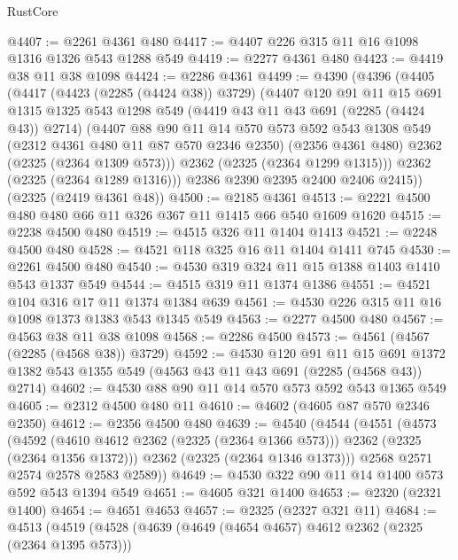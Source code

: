\begin{lexlean}{RustCore}
\begin{coremodule}
@4407 := @2261 @4361 @480
@4417 := @4407 @226 @315 @11 @16 @1098 @1316 @1326 @543 @1288 @549
@4419 := @2277 @4361 @480
@4423 := @4419 @38 @11 @38 @1098
@4424 := @2286 @4361
@4499 := @4390
    (@4396
      (@4405
        (@4417
          (@4423 (@2285 (@4424 @38)) @3729)
          (@4407
            @120
            @91
            @11
            @15
            @691
            @1315
            @1325
            @543
            @1298
            @549
            (@4419 @43 @11 @43 @691 (@2285 (@4424 @43)) @2714)
            (@4407
              @88
              @90
              @11
              @14
              @570
              @573
              @592
              @543
              @1308
              @549
              (@2312 @4361 @480 @11 @87 @570 @2346 @2350)
              (@2356 @4361 @480)
              @2362
              (@2325 (@2364 @1309 @573)))
            @2362
            (@2325 (@2364 @1299 @1315)))
          @2362
          (@2325 (@2364 @1289 @1316)))
        @2386
        @2390
        @2395
        @2400
        @2406
        @2415))
    (@2325 (@2419 @4361 @48))
@4500 := @2185 @4361
@4513 := @2221 @4500 @480 @480 @66 @11 @326 @367 @11 @1415 @66 @540 @1609 @1620
@4515 := @2238 @4500 @480
@4519 := @4515 @326 @11 @1404 @1413
@4521 := @2248 @4500 @480
@4528 := @4521 @118 @325 @16 @11 @1404 @1411 @745
@4530 := @2261 @4500 @480
@4540 := @4530 @319 @324 @11 @15 @1388 @1403 @1410 @543 @1337 @549
@4544 := @4515 @319 @11 @1374 @1386
@4551 := @4521 @104 @316 @17 @11 @1374 @1384 @639
@4561 := @4530 @226 @315 @11 @16 @1098 @1373 @1383 @543 @1345 @549
@4563 := @2277 @4500 @480
@4567 := @4563 @38 @11 @38 @1098
@4568 := @2286 @4500
@4573 := @4561 (@4567 (@2285 (@4568 @38)) @3729)
@4592 := @4530
    @120
    @91
    @11
    @15
    @691
    @1372
    @1382
    @543
    @1355
    @549
    (@4563 @43 @11 @43 @691 (@2285 (@4568 @43)) @2714)
@4602 := @4530 @88 @90 @11 @14 @570 @573 @592 @543 @1365 @549
@4605 := @2312 @4500 @480 @11
@4610 := @4602 (@4605 @87 @570 @2346 @2350)
@4612 := @2356 @4500 @480
@4639 := @4540
    (@4544
      (@4551
        (@4573
          (@4592 (@4610 @4612 @2362 (@2325 (@2364 @1366 @573))) @2362 (@2325 (@2364 @1356 @1372)))
          @2362
          (@2325 (@2364 @1346 @1373)))
        @2568
        @2571
        @2574
        @2578
        @2583
        @2589))
@4649 := @4530 @322 @90 @11 @14 @1400 @573 @592 @543 @1394 @549
@4651 := @4605 @321 @1400
@4653 := @2320 (@2321 @1400)
@4654 := @4651 @4653
@4657 := @2325 (@2327 @321 @11)
@4684 := @4513
    (@4519
      (@4528
        (@4639
          (@4649 (@4654 @4657) @4612 @2362 (@2325 (@2364 @1395 @573)))

\end{coremodule}
\end{lexlean}
